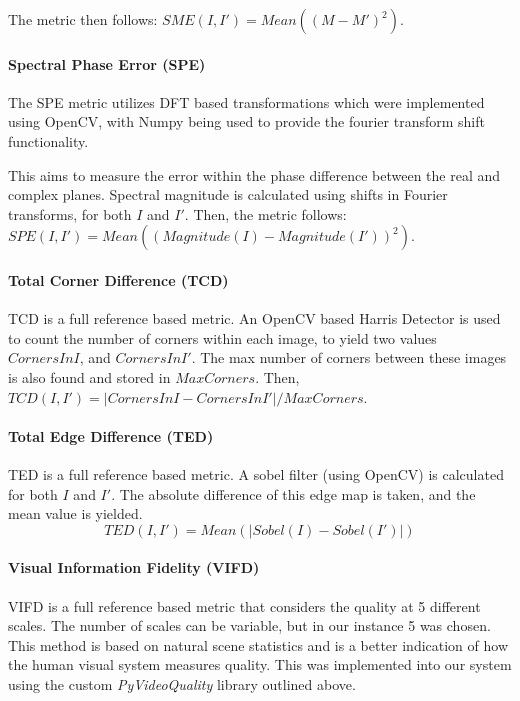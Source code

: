 \documentclass[12pt,a4paper]{article}
\begin{document}
                The metric then follows: $SME(I, I') = Mean((M - M')^2)$.
             
            \paragraph{Spectral Phase Error (SPE)}
                The SPE metric utilizes DFT based transformations which were implemented using OpenCV, with Numpy being used to provide the fourier transform shift functionality.

                This aims to measure the error within the phase difference between the real and complex planes. Spectral magnitude is calculated using shifts in Fourier transforms,
                for both $I$ and $I'$. Then, the metric follows: $SPE(I, I') = Mean((Magnitude(I) - Magnitude(I'))^2)$.


            \paragraph{Total Corner Difference (TCD)}
                TCD is a full reference based metric. An OpenCV based Harris Detector is used to count the number of corners within each image,
                to yield two values $CornersInI$, and $CornersInI'$. The max number of corners between these images is also found and stored in $MaxCorners$.
                Then, $TCD(I,I') = |CornersInI - CornersInI'| / MaxCorners$.
                
            \paragraph{Total Edge Difference (TED)}
                TED is a full reference based metric. A sobel filter (using OpenCV) is calculated for both $I$ and $I'$. The absolute difference of this edge map is taken,
                and the mean value is yielded.
                $$TED(I, I') = Mean(|Sobel(I) - Sobel(I')|)$$

            \paragraph{Visual Information Fidelity (VIFD)}
                VIFD is a full reference based metric that considers the quality at 5 different scales. The number of scales can be variable, but in our instance 5 was chosen.
                This method is based on natural scene statistics and is a better indication of how the human visual system measures quality.
                This was implemented into our system using the custom \emph{PyVideoQuality} library outlined above.
\end{document}
